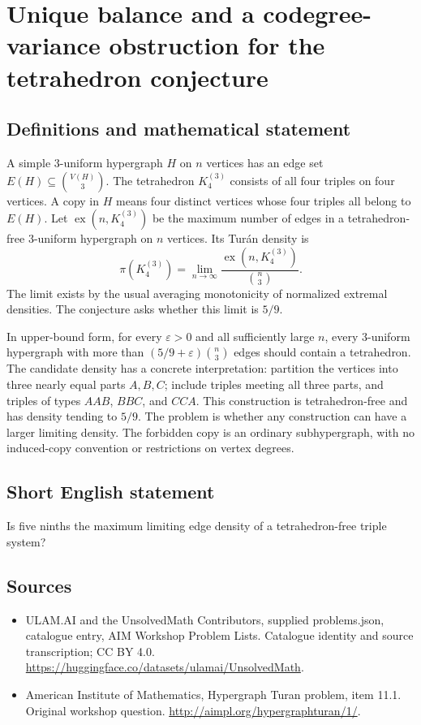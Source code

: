 \documentclass[11pt,a4paper]{article}
\begin{document}
\section*{Unique balance and a codegree-variance obstruction for the tetrahedron conjecture}\label{statement}

\subsection{Definitions and mathematical statement}
A simple $3$-uniform hypergraph $H$ on $n$ vertices has an edge set
$E(H)\subseteq\binom{V(H)}3$. The tetrahedron $K_4^{(3)}$ consists
of all four triples on four vertices. A copy in $H$ means four distinct
vertices whose four triples all belong to $E(H)$.
Let $\operatorname{ex}(n,K_4^{(3)})$ be the maximum number of edges
in a tetrahedron-free $3$-uniform hypergraph on $n$ vertices. Its
Tur\'an density is
\[
 \pi(K_4^{(3)})=\lim_{n\to\infty}
       \frac{\operatorname{ex}(n,K_4^{(3)})}{\binom n3}.
\]
The limit exists by the usual averaging monotonicity of normalized
extremal densities. The conjecture asks whether this limit is $5/9$.

In upper-bound form, for every $\varepsilon>0$ and all sufficiently
large $n$, every $3$-uniform hypergraph with more than
$(5/9+\varepsilon)\binom n3$ edges should contain a tetrahedron.
The candidate density has a concrete interpretation: partition the
vertices into three nearly equal parts $A,B,C$; include triples meeting
all three parts, and triples of types $AAB$, $BBC$, and $CCA$.
This construction is tetrahedron-free and has density tending to $5/9$.
The problem is whether any construction can have a larger limiting
density. The forbidden copy is an ordinary subhypergraph, with no
induced-copy convention or restrictions on vertex degrees.
\subsection{Short English statement}
Is five ninths the maximum limiting edge density of a tetrahedron-free triple system?
\subsection{Sources}
\begin{itemize}
\item[S1] ULAM.AI and the UnsolvedMath Contributors, supplied problems.json, catalogue entry, AIM Workshop Problem Lists. Catalogue identity and source transcription; CC BY 4.0.
\url{https://huggingface.co/datasets/ulamai/UnsolvedMath}.
\item[S2] American Institute of Mathematics, Hypergraph Turan problem, item 11.1. Original workshop question.
\url{http://aimpl.org/hypergraphturan/1/}.
\end{itemize}
\end{document}
